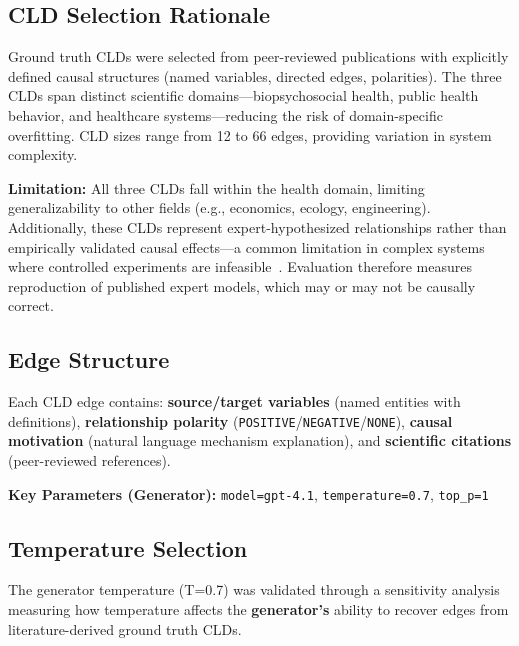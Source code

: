 \subsection{CLD Selection Rationale}
Ground truth CLDs were selected from peer-reviewed publications with explicitly defined causal structures (named variables, directed edges, polarities). The three CLDs span distinct scientific domains---biopsychosocial health, public health behavior, and healthcare systems---reducing the risk of domain-specific overfitting. CLD sizes range from 12 to 66 edges, providing variation in system complexity.

\textbf{Limitation:} All three CLDs fall within the health domain, limiting generalizability to other fields (e.g., economics, ecology, engineering). Additionally, these CLDs represent expert-hypothesized relationships rather than empirically validated causal effects---a common limitation in complex systems where controlled experiments are infeasible~\cite{uleman2024triangulation,crielaard2020socialnorms,smeekes2023emergency}. Evaluation therefore measures reproduction of published expert models, which may or may not be causally correct.

\subsection{Edge Structure}
Each CLD edge contains: \textbf{source/target variables} (named entities with definitions), \textbf{relationship polarity} (\texttt{POSITIVE}/\texttt{NEGATIVE}/\texttt{NONE}), \textbf{causal motivation} (natural language mechanism explanation), and \textbf{scientific citations} (peer-reviewed references).

\textbf{Key Parameters (Generator):} \texttt{model=gpt-4.1}, \texttt{temperature=0.7}, \texttt{top\_p=1}

\subsection{Temperature Selection}

The generator temperature (T=0.7) was validated through a sensitivity analysis measuring how temperature affects the \textbf{generator's} ability to recover edges from literature-derived ground truth CLDs.

